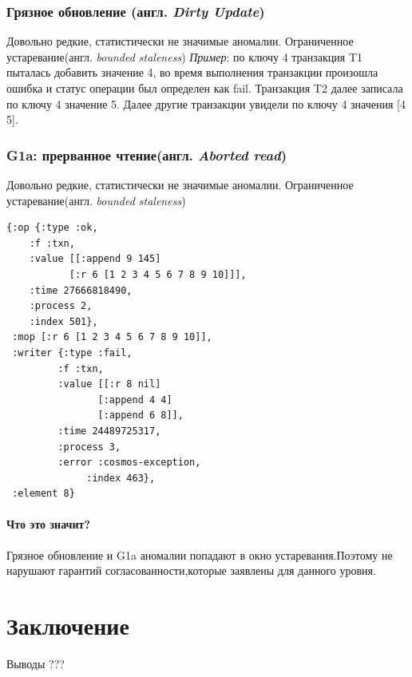 \documentclass[12pt,  openany]{book}
\begin{document}
\subsection{Грязное обновление (англ. \textit{Dirty Update})}
Довольно редкие, статистически не значимые аномалии.
Ограниченное устаревание(англ.  \textit{bounded staleness})
\textit{Пример}: по ключу 4 транзакция T1 пыталась добавить значение 4, во время выполнения транзакции произошла ошибка и статус операции был определен как fail. Транзакция T2 далее записала по ключу 4 значение 5.  Далее другие транзакции увидели по ключу 4 значения [4 5].

\subsection{G1a: прерванное чтение(англ. \textit{Aborted read})}
Довольно редкие, статистически не значимые аномалии.
Ограниченное устаревание(англ.  \textit{bounded staleness})
\begin{lstlisting}[caption={Пример G1a аномалии}]
{:op {:type :ok,
	:f :txn,
	:value [[:append 9 145]
		   [:r 6 [1 2 3 4 5 6 7 8 9 10]]],
	:time 27666818490,
	:process 2,
	:index 501},
 :mop [:r 6 [1 2 3 4 5 6 7 8 9 10]],
 :writer {:type :fail,
	     :f :txn,
	     :value [[:r 8 nil]
		        [:append 4 4]
		        [:append 6 8]],
	     :time 24489725317,
	     :process 3,
	     :error :cosmos-exception,
              :index 463},
 :element 8}
\end{lstlisting}
\par

\subsubsection{Что это значит?}
\par
Грязное обновление и G1a аномалии попадают в окно устаревания.Поэтому не нарушают гарантий согласованности,которые заявлены для данного уровня.

\chapter{Заключение}
Выводы
???


\end{document}
